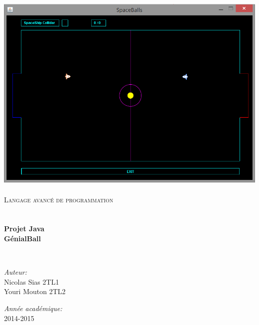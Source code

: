 \begin{titlepage}
\begin{center}

\includegraphics[width=15cm]{./TerrainAvecJoueur.png}~\\[1cm]

\textsc{\LARGE Langage avancé de programmation}\\[1.5cm]

\textsc{\Large }\\[0.5cm]

\HRule \\[0.4cm]

{\huge \bfseries Projet Java\\
GénialBall \\[0.4cm] }

\HRule \\[1.5cm]

\begin{minipage}{0.4\textwidth}
\begin{flushleft} \large
\emph{Auteur:}\\
Nicolas Sias 2TL1\\
Youri Mouton 2TL2
\end{flushleft}
\end{minipage}
\begin{minipage}{0.4\textwidth}
\begin{flushright} \large
\emph{Année académique:} \\
2014-2015
\end{flushright}
\end{minipage}

\vfill

\end{center}
\end{titlepage}